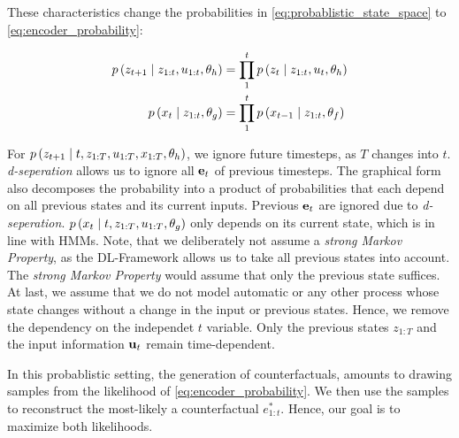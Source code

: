 \documentclass[./../../paper.tex]{subfiles}
\begin{document}

These characteristics change the probabilities in \autoref{eq:probablistic_state_space} to \autoref{eq:encoder_probability}:

\begin{align}
    \label{eq:encoder_probability}
    p\left(z_{t+1} \mid z_{1:t}, u_{1:t}, \theta_h\right)                   & =  \prod_{1}^{t} p\left(z_t \mid z_{1:t}, u_{t}, \theta_h\right) \\
    p\left(x_t \mid z_{1:t}, \theta_g\right)                   & = \prod_{1}^{t} p\left(x_{t-1} \mid z_{1:t},\theta_f\right)
\end{align}

For $p\left(z_{t+1} \mid t, z_{1:T}, u_{1:T}, x_{1:T}, \theta_h\right)$, we ignore future timesteps, as $T$ changes into $t$. \emph{d-seperation} allows us to ignore all $\mathbf{e}_t$ of previous timesteps. The graphical form also decomposes the probability into a product of probabilities that each depend on all previous states and its current inputs. Previous $\mathbf{e}_t$ are ignored due to \emph{d-seperation}. $p\left(x_t \mid t, z_{1:T}, u_{1:T}, \theta_g\right)$ only depends on its current state, which is in line with \glspl{HMM}.
Note, that we deliberately not assume a \emph{strong Markov Property}, as the \gls{DL}-Framework allows us to take all previous states into account. The \emph{strong Markov Property} would assume that only the previous state suffices. At last, we assume that we do not model automatic or any other process whose state changes without a change in the input or previous states. Hence, we remove the dependency on the independet $t$ variable. Only the previous states $z_{1:T}$ and the input information $\mathbf{u}_t$ remain time-dependent. 

In this probablistic setting, the generation of counterfactuals, amounts to drawing samples from the likelihood of \autoref{eq:encoder_probability}. We then use the samples to reconstruct the most-likely a counterfactual $e_{1:t}^*$. Hence, our goal is to maximize both likelihoods. 

\end{document}
